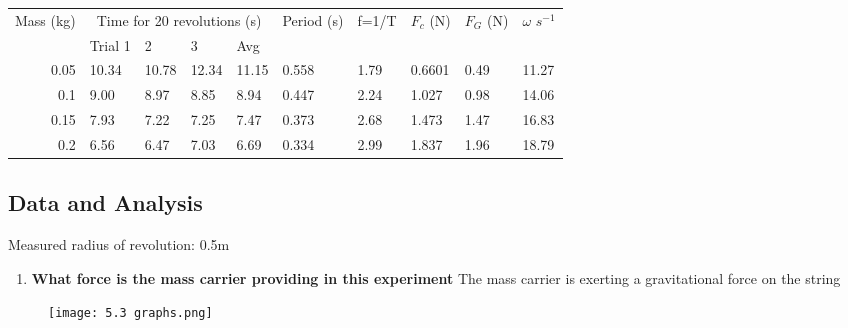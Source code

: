 		\begin{table}[htbp]
			\centering
			\begin{tabular}{llllllllll}
			Mass (kg) & \multicolumn{4}{c}{Time for 20 revolutions (s)} & \multicolumn{1}{l}{Period (s)} & \multicolumn{1}{l}{f=1/T} & \multicolumn{1}{l}{$F_c$ (N)} & \multicolumn{1}{l}{$F_G$ (N)} & \multicolumn{1}{l}{$\omega$ \textdegree$s^{-1}$} \\
					& \multicolumn{1}{l}{Trial 1} & 2     & 3     & \multicolumn{1}{l}{Avg} &       &       &       &       &  \\ \hline
			\multicolumn{1}{r}{0.05} & 10.34 & 10.78 & 12.34 & 11.15 & 0.558 & 1.79  & 0.6601 & 0.49  & 11.27 \\
			\multicolumn{1}{r}{0.1} & 9.00  & 8.97  & 8.85  & 8.94  & 0.447 & 2.24  & 1.027 & 0.98  & 14.06 \\
			\multicolumn{1}{r}{0.15} & 7.93  & 7.22  & 7.25  & 7.47  & 0.373 & 2.68  & 1.473 & 1.47  & 16.83 \\
			\multicolumn{1}{r}{0.2} & 6.56  & 6.47  & 7.03  & 6.69  & 0.334 & 2.99  & 1.837 & 1.96  & 18.79 \\
			\end{tabular}
		\end{table}
		
	\subsection{Data and Analysis}
		Measured radius of revolution: 0.5m
		\begin{enumerate}
			\item \textbf{What force is the mass carrier providing in this experiment}
				\subitem The mass carrier is exerting a gravitational force on the string
		\end{enumerate}

		\begin{figure}[H]
			\centering
			\texttt{[image: 5.3 graphs.png]}
		\end{figure}

